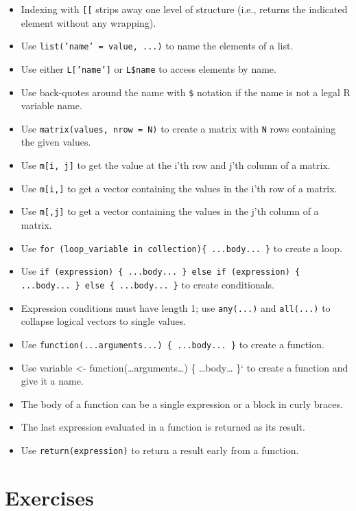 \begin{itemize}
\item
  Indexing with \texttt{[[} strips away one level of structure (i.e., returns the indicated element without any wrapping).
\item
  Use \texttt{list('name' = value, ...)} to name the elements of a list.
\item
  Use either \texttt{L['name']} or \texttt{L\$name} to access elements by name.
\item
  Use back-quotes around the name with \texttt{\$} notation if the name is not a legal R variable name.
\item
  Use \texttt{matrix(values, nrow = N)} to create a matrix with \texttt{N} rows containing the given values.
\item
  Use \texttt{m[i, j]} to get the value at the i'th row and j'th column of a matrix.
\item
  Use \texttt{m[i,]} to get a vector containing the values in the i'th row of a matrix.
\item
  Use \texttt{m[,j]} to get a vector containing the values in the j'th column of a matrix.
\item
  Use \texttt{for (loop\_variable in collection)\{ ...body... \}} to create a loop.
\item
  Use \texttt{if (expression) \{ ...body... \} else if (expression) \{ ...body... \} else \{ ...body... \}} to create conditionals.
\item
  Expression conditions must have length 1; use \texttt{any(...)} and \texttt{all(...)} to collapse logical vectors to single values.
\item
  Use \texttt{function(...arguments...) \{ ...body... \}} to create a function.
\item
  Use variable \textless{}- function(\ldots{}arguments\ldots{}) \{ \ldots{}body\ldots{} \}` to create a function and give it a name.
\item
  The body of a function can be a single expression or a block in curly braces.
\item
  The last expression evaluated in a function is returned as its result.
\item
  Use \texttt{return(expression)} to return a result early from a function.
\end{itemize}

\section{Exercises}

